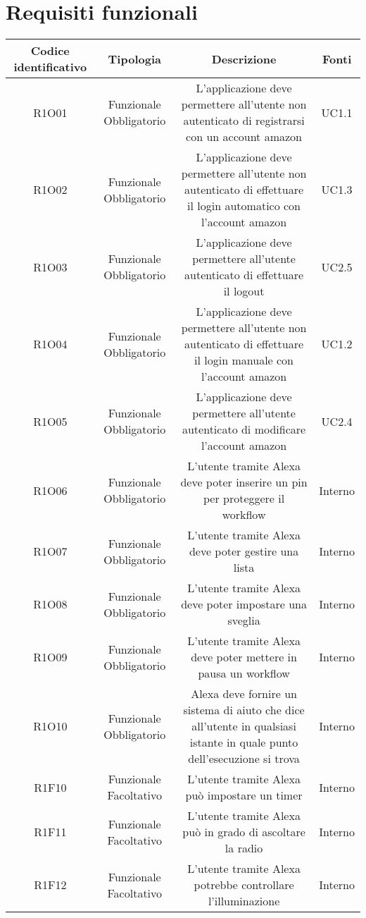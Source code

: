 \section{Requisiti funzionali}
\begin{tabularx}{\textwidth}{|C|C|C|C|}
	\hline
     \textbf{Codice identificativo} & \textbf{Tipologia} & \textbf{Descrizione} & \textbf{Fonti} \\
    \hline
	\endhead
	R1O01& Funzionale Obbligatorio &L'applicazione deve permettere all'utente non autenticato di registrarsi con un account amazon& UC1.1	\\
	\hline
	R1O02& Funzionale Obbligatorio &L'applicazione deve permettere all'utente non autenticato di effettuare il login automatico con l'account amazon & UC1.3\\
	\hline
	R1O03& Funzionale Obbligatorio &L'applicazione deve permettere all'utente autenticato di  effettuare il logout & UC2.5\\
	\hline
	R1O04& Funzionale Obbligatorio &L'applicazione deve permettere all'utente non autenticato di effettuare il login manuale con l'account amazon& UC1.2\\
	\hline
	R1O05& Funzionale Obbligatorio&L'applicazione deve permettere all'utente autenticato di modificare l'account amazon& UC2.4\\
	\hline
	R1O06& Funzionale Obbligatorio&L'utente tramite Alexa deve poter inserire un pin per proteggere il workflow & Interno \\
	\hline
	R1O07&Funzionale Obbligatorio & L'utente tramite Alexa deve poter gestire una lista& Interno\\
	\hline
	R1O08&Funzionale Obbligatorio &L'utente tramite Alexa deve poter impostare una sveglia &Interno\\
	\hline
	R1O09&Funzionale Obbligatorio  &L'utente tramite Alexa deve poter mettere in pausa un workflow &Interno \\
	\hline
	R1O10&Funzionale Obbligatorio&Alexa deve fornire un sistema di aiuto che dice all'utente in qualsiasi istante in quale punto dell'esecuzione si trova & Interno\\
	\hline
	R1F10&Funzionale Facoltativo  &L'utente tramite Alexa può impostare un timer &Interno \\
	\hline
	R1F11&Funzionale Facoltativo  &L'utente tramite Alexa può in grado di ascoltare la radio &Interno \\
	\hline	
	R1F12&Funzionale Facoltativo  &L'utente tramite Alexa potrebbe controllare l'illuminazione &Interno \\

\end{tabularx}
